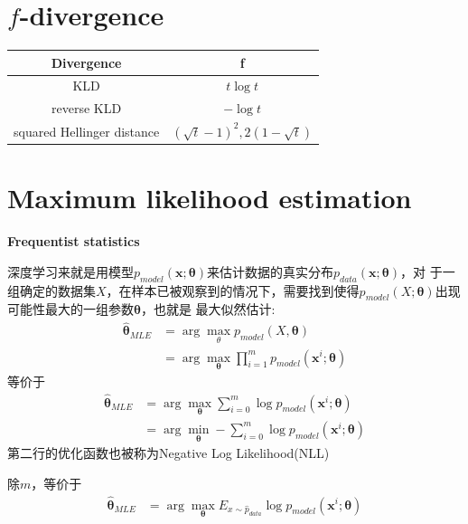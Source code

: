 \section{$f$-divergence}
\begin{tabular}{cc}
\toprule
Divergence & f \\
\midrule
KLD & $t\log{t}$ \\
reverse KLD & $-\log{t}$ \\
squared Hellinger distance & $(\sqrt{t} - 1)^2, 2(1 - \sqrt{t})$ \\
\bottomrule
\end{tabular}

\section{Maximum likelihood estimation}
\textbf{Frequentist statistics}


深度学习来就是用模型$p_{model}(\boldsymbol{x};\boldsymbol{\theta})$来估计数据的真实分布$p_{data}(\boldsymbol{x};\boldsymbol{\theta})$，对
于一组确定的数据集$X$，在样本已被观察到的情况下，需要找到使得$p_{model}(X; \boldsymbol{\theta})$出现可能性最大的一组参数$\boldsymbol{\theta}$，也就是
最大似然估计:
\begin{equation}
    \begin{split}
        \hat{\boldsymbol{\theta}}_{MLE} &= \arg \max_\theta p_{model}(X, \boldsymbol{\theta}) \\
        &= \arg \max_{\boldsymbol{\theta}} \prod _{i=1}^m p_{model}(\boldsymbol{x}^i; \boldsymbol{\theta})
    \end{split}
\end{equation}
等价于
\begin{equation}
    \begin{split}
        \hat{\boldsymbol{\theta}}_{MLE} &= \arg \max_{\boldsymbol{\theta}} \sum_{i=0}^m \log p_{model}(\boldsymbol{x}^i; \boldsymbol{\theta}) \\
        &= \arg \min_{\boldsymbol{\theta}} - \sum_{i=0}^m \log p_{model}(\boldsymbol{x}^i; \boldsymbol{\theta})
    \end{split}
\end{equation}
第二行的优化函数也被称为Negative Log Likelihood(NLL)


除$m$，等价于
\begin{equation}
    \begin{split}
        \hat{\boldsymbol{\theta}}_{MLE} &= \arg \max_{\boldsymbol{\theta}} E _{x \sim \hat p_{data}} \log p_{model}(\boldsymbol{x}^i; \boldsymbol{\theta})
    \end{split}
\end{equation}

